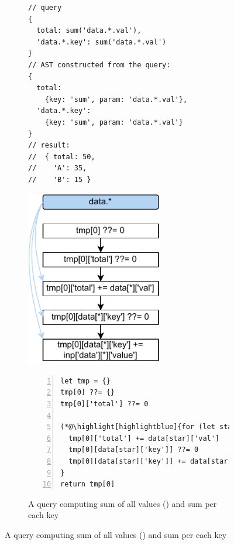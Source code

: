 \documentclass[runningheads]{llncs}
\begin{document}
\begin{figure}[t!]
\begin{subfigure}{\textwidth}
\begin{minipage}{0.3\textwidth}
\begin{lstlisting}[style=JavaScriptTiny, columns=flexible]
// query
{
  total: sum('data.*.val'),
  'data.*.key': sum('data.*.val')
}
// AST constructed from the query:
{
  total:
    {key: 'sum', param: 'data.*.val'},
  'data.*.key':
    {key: 'sum', param: 'data.*.val'}
}
// result:
//  { total: 50, 
//    'A': 35,
//    'B': 15 }
\end{lstlisting}
\end{minipage}
\begin{minipage}{0.3\textwidth}
\hspace{3.6mm}
\includegraphics[width=0.657\textwidth]{images/intro_q2_ir.pdf}
\end{minipage}
\begin{minipage}{0.38\textwidth}
\begin{lstlisting}[style=JavaScriptTiny, columns=flexible, numbers=left, xleftmargin=2pt]
let tmp = {}
tmp[0] ??= {}
tmp[0]['total'] ??= 0

(*@\highlight[highlightblue]{for (let star in data) }@*) {
  tmp[0]['total'] += data[star]['val']
  tmp[0][data[star]['key']] ??= 0
  tmp[0][data[star]['key']] += data[star]['val']
}
return tmp[0]
\end{lstlisting}
\end{minipage}
\vspace{-4mm}
\caption{A query computing sum of all values
() and sum per each key}\label{fig:intro_q2}
\end{subfigure}


\end{figure}
\end{document}
